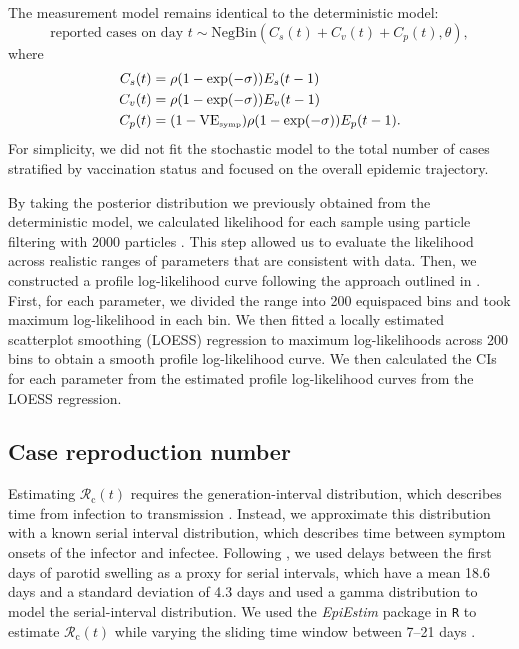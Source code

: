 \documentclass[12pt]{article}
\begin{document}
The measurement model remains identical to the deterministic model: 
\begin{equation}
\textrm{reported cases on day } t \sim \mathrm{NegBin}(C_s(t) + C_v(t) + C_p(t), \theta),
\end{equation}
where 
\begin{align}
C_s(t) &= \rho (1-\exp(- \sigma)) E_s(t-1)\\
C_v(t) &= \rho (1-\exp(- \sigma)) E_v(t-1)\\
C_p(t) &= (1- \mathrm{VE}_{\textrm{\tiny{symp}}}) \rho (1-\exp(- \sigma)) E_p(t-1).
\end{align}
For simplicity, we did not fit the stochastic model to the total number of cases stratified by vaccination status and focused on the overall epidemic trajectory.

By taking the posterior distribution we previously obtained from the deterministic model, we calculated likelihood for each sample using particle filtering with 2000 particles \citep{king2015statistical}.
This step allowed us to evaluate the likelihood across realistic ranges of parameters that are consistent with data.
Then, we constructed a profile log-likelihood curve following the approach outlined in \citep{park2021epidemiological}.
First, for each parameter, we divided the range into 200 equispaced bins and took maximum log-likelihood in each bin.
We then fitted a locally estimated scatterplot smoothing (LOESS) regression to maximum log-likelihoods across 200 bins to obtain a smooth profile log-likelihood curve.
We then calculated the CIs for each parameter from the estimated profile log-likelihood curves from the LOESS regression.

\subsection*{Case reproduction number}

Estimating $\mathcal{R}_{\mathrm c}(t)$ requires the generation-interval distribution, which describes time from infection to transmission \citep{gostic2020}. 
Instead, we approximate this distribution with a known serial interval distribution, which describes time between symptom onsets of the infector and infectee.
Following \cite{simpson1952infectiousness}, we used delays between the first days of parotid swelling as a proxy for serial intervals, which have a mean 18.6 days and a standard deviation of 4.3 days
and used a gamma distribution to model the serial-interval distribution.
We used the \textit{EpiEstim} package in \texttt{R} to estimate $\mathcal{R}_{\mathrm c}(t)$ while varying the sliding time window between 7--21 days \citep{cori2013new}.
\end{document}
